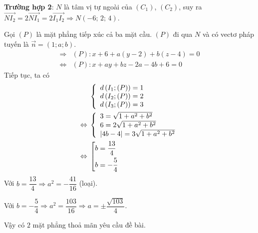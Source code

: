 \begin{ex}
{{			\noindent \textbf{Trường hợp 2}: $N$ là tâm vị tự ngoài của $(C_1)$, $(C_2)$, suy ra $\overrightarrow {N{I_2}}  = 2\overrightarrow {N{I_1}}  = 2\overrightarrow {{I_1}{I_2}}  \Rightarrow N\left( { - 6;\,2;\,4} \right)$.
		}{}
		\noindent Gọi $(P)$ là mặt phẳng tiếp xúc cả ba mặt cầu. $(P)$ đi qua $N$ và có vectơ pháp tuyến là $\overrightarrow n = (1;a;b)$.
		\begin{align*}
			\Rightarrow{} &\left( P \right) \colon x + 6 + a\left( {y - 2} \right) + b\left( {z - 4} \right) = 0 \\
			\Leftrightarrow{} &\left( P \right) \colon x + ay + bz - 2a - 4b + 6 = 0
		\end{align*}
		\noindent Tiếp tục, ta có
		\begin{align*}
			&\left\{ {\begin{array}{l}
					{d\left( {{I_1};(P)} \right) = 1} \\ 
					{d\left( {{I_2};(P)} \right) = 2} \\ 
					{d\left( {{I_3};(P)} \right) = 3} 
			\end{array}} \right. \\
			\Leftrightarrow{} &\left\{ \begin{array}{l}
				3 = \sqrt {1 + {a^2} + {b^2}} \\
				6 = 2\sqrt {1 + {a^2} + {b^2}} \\
				\left| {4b - 4} \right| = 3\sqrt {1 + {a^2} + {b^2}}  \hfill \\ 
			\end{array}  \right. \\
			\Leftrightarrow{} &\left[ \begin{gathered}
				b = \frac{{13}}{4} \hfill \\
				b =  - \frac{5}{4} \hfill \\ 
			\end{gathered}  \right.
		\end{align*}
		\noindent Với $b = \dfrac{13}{4} \Rightarrow a^2 = -\dfrac{41}{16}$ (loại).
		
		\noindent Với $b = -\dfrac{5}{4} \Rightarrow {a^2} = \dfrac{{103}}{{16}} \Rightarrow a =  \pm \dfrac{{\sqrt {103} }}{4}$.
		
		\noindent Vậy có $2$ mặt phẳng thoả mãn yêu cầu đề bài.
	}
\end{ex}
